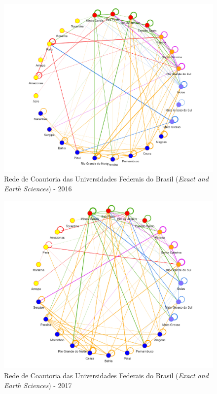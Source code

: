 \begin{figure}[H]
	\centering
	\includegraphics[width=\linewidth]{Imagens/rede-exact-br-2016.pdf}
	\caption{Rede de Coautoria das Universidades Federais do Brasil (\textit{Exact and Earth Sciences}) - 2016}
	\label{Rede de Coautoria - UF EXACT BR 2016}
\end{figure}

\begin{figure}[H]
	\centering
	\includegraphics[width=\linewidth]{Imagens/rede-exact-br-2017.pdf}
	\caption{Rede de Coautoria das Universidades Federais do Brasil (\textit{Exact and Earth Sciences}) - 2017}
	\label{Rede de Coautoria - UF EXACT BR 2017}
\end{figure}



